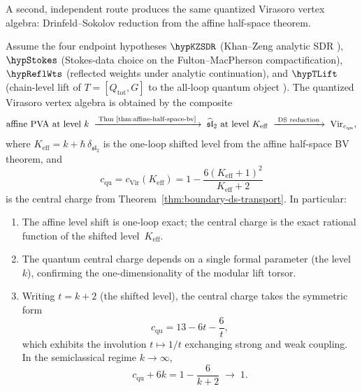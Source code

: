 A second, independent route produces the same quantized Virasoro vertex
algebra: Drinfeld--Sokolov reduction from the affine half-space theorem.

\begin{theorem}
\label{thm:virasoro-quantization-ds}
Assume the four endpoint hypotheses
$\hypKZSDR$ (Khan--Zeng analytic SDR \cite{KZ25}),
$\hypStokes$ (Stokes-data choice on the Fulton--MacPherson
compactification),
$\hypReflWts$ (reflected weights under analytic continuation),
and $\hypTLift$ (chain-level lift of $T = [Q_{\mathrm{tot}}, G]$ to
the all-loop quantum object \cite{Costello2011Renorm,CG17,LurieHA}).
The quantized Virasoro vertex algebra is obtained by the composite
\[
\text{affine PVA at level }k
\;\xrightarrow{\;\text{Thm~\ref{thm:affine-half-space-bv}}\;}
\;\widehat{\mathfrak{sl}}_2\text{ at level }K_{\mathrm{eff}}
\;\xrightarrow{\;\text{DS reduction}\;}
\;\mathrm{Vir}_{c_{\mathrm{qu}}},
\]
where $K_{\mathrm{eff}} = k + \hbar\,\delta_{\mathfrak{sl}_2}$ is the
one-loop shifted level from the affine half-space BV theorem, and
\begin{equation}\label{eq:virasoro-central-charge-ds}
c_{\mathrm{qu}} = c_{\mathrm{Vir}}(K_{\mathrm{eff}})
= 1 - \frac{6(K_{\mathrm{eff}}+1)^2}{K_{\mathrm{eff}}+2}
\end{equation}
is the central charge from
Theorem~\textup{\ref{thm:boundary-ds-transport}}.
In particular:
\begin{enumerate}[leftmargin=2.4em]
\item The affine level shift is one-loop exact; the central charge is
the exact rational function of the shifted level~$K_{\mathrm{eff}}$.
\item The quantum central charge depends on a single formal parameter
(the level~$k$), confirming the one-dimensionality of the modular lift
torsor.
\item Writing $t = k+2$ (the shifted level), the central charge
takes the symmetric form
\[
c_{\mathrm{qu}} = 13 - 6t - \frac{6}{t},
\]
which exhibits the involution $t\mapsto 1/t$ exchanging strong and
weak coupling. In the semiclassical regime $k\to\infty$,
\[
c_{\mathrm{qu}} + 6k = 1 - \frac{6}{k+2} \;\to\; 1.
\]
\end{enumerate}
\end{theorem}

